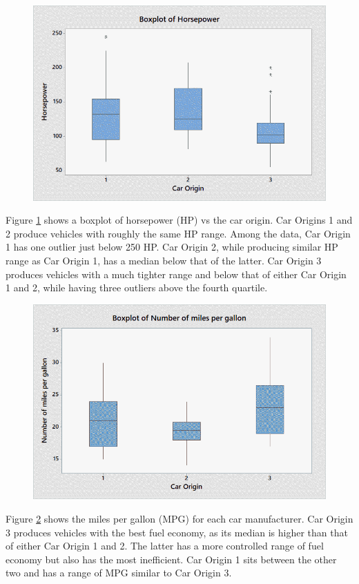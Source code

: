 \documentclass[10pt,a4paper]{article}
\begin{document}
\begin{figure}[tb]
	\centering
	\includegraphics[width=0.75\linewidth]{box-hp_vs_orig.png}
	\caption{}
	\label{fig:hp-vs-orig}
\end{figure}

Figure \ref{fig:hp-vs-orig} shows a boxplot of horsepower (HP) vs the car origin. Car Origins 1 and 2 produce vehicles with roughly the same HP range. Among the data, Car Origin 1 has one outlier just below 250 HP. Car Origin 2, while producing similar HP range as Car Origin 1, has a median below that of the latter. Car Origin 3 produces vehicles with a much tighter range and below that of either Car Origin 1 and 2, while having three outliers above the fourth quartile.

\begin{figure}[tb]
	\centering
	\includegraphics[width=0.75\linewidth]{box-mpg_vs_orig.png}
	\caption{}
	\label{fig:mpg-vs-orig}
\end{figure}

Figure \ref{fig:mpg-vs-orig} shows the miles per gallon (MPG) for each car manufacturer. Car Origin 3 produces vehicles with the best fuel economy, as its median is higher than that of either Car Origin 1 and 2. The latter has a more controlled range of fuel economy but also has the most inefficient. Car Origin 1 sits between the other two and has a range of MPG similar to Car Origin 3.
\end{document}
